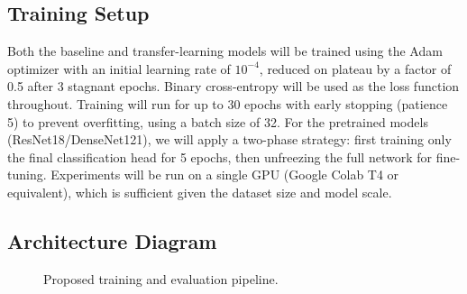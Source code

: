 \documentclass[acmsmall,screen,nonacm]{acmart}
\begin{document}
\subsection{Training Setup}
Both the baseline and transfer-learning models will be trained using the Adam optimizer with an initial learning rate of $10^{-4}$, reduced on plateau by a factor of 0.5 after 3 stagnant epochs. Binary cross-entropy will be used as the loss function throughout. Training will run for up to 30 epochs with early stopping (patience 5) to prevent overfitting, using a batch size of 32. For the pretrained models (ResNet18/DenseNet121), we will apply a two-phase strategy: first training only the final classification head for 5 epochs, then unfreezing the full network for fine-tuning. Experiments will be run on a single GPU (Google Colab T4 or equivalent), which is sufficient given the dataset size and model scale.

\subsection{Architecture Diagram}
\begin{figure}[h]
  \centering
  \caption{Proposed training and evaluation pipeline.}
\end{figure}
\end{document}
